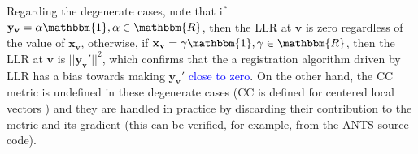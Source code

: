 Regarding the degenerate cases, note that if $\mathbf{y}_{\mathbf{v}} = \alpha \mathbbm{1}, \alpha\in \mathbbm{R}$, then the LLR at $\mathbf{v}$ is zero regardless of the value of $\mathbf{x}_{\mathbf{v}}$, otherwise, if $\mathbf{x}_{\mathbf{v}} = \gamma \mathbbm{1}, \gamma\in \mathbbm{R}$, then the LLR at $\mathbf{v}$ is $||\mathbf{y}_{\mathbf{v}}'||^{2}$, which confirms that the a registration algorithm driven by LLR has a bias towards making $\mathbf{y}_{\mathbf{v}}'$ \textcolor{blue}{close to zero}. On the other hand, the CC metric is undefined in these degenerate cases (CC is defined for centered local vectors \cite{Avants2008}\cite{Avants2011}) and they are handled in practice by discarding their contribution to the metric and its gradient (this can be verified, for example, from the ANTS \cite{Avants2011a} source code).

